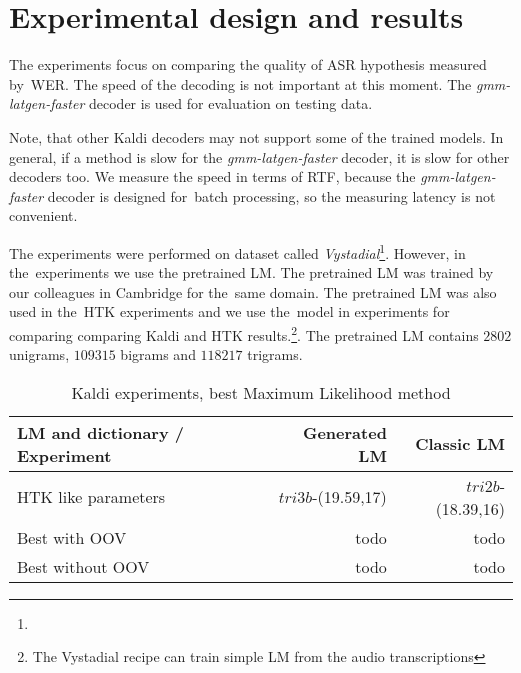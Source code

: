 {\section{Experimental design and results} 
\label{sec:exps}
The experiments focus on comparing the quality of ASR hypothesis measured by~\ac{WER}.
The speed of the decoding is not important at this moment.  The {\it gmm-latgen-faster}\/ decoder is used for evaluation on testing data. 

Note, that other Kaldi decoders may not support some of the trained models.
In general, if a method is slow for the {\it gmm-latgen-faster}\/ decoder, it is slow for other decoders too.
We measure the speed in terms of \ac{RTF}, because the {\it gmm-latgen-faster}\/ decoder is designed for~batch 
processing, so the measuring latency is not convenient.


The experiments were performed on dataset called {\it Vystadial}\footnote{}.
However, in the~experiments we use the pretrained \ac{LM}.
The pretrained \acl{LM} was trained by our colleagues in Cambridge for the~same domain.
The pretrained \ac{LM} was also used in the~\ac{HTK} experiments and we use the~model in experiments 
for comparing comparing Kaldi and \ac{HTK} results.\footnote{The Vystadial recipe can train simple \ac{LM} from the audio transcriptions}.
The pretrained \ac{LM} contains $2802$ unigrams, $109315$ bigrams and
$118217$ trigrams. 


\begin{table}[!htp]\label{tab:exp_best}
\begin{tabular}{lrr}
\hline
\parbox[t]{6.0cm}{\ac{LM} and dictionary / Experiment} & Generated \acs{LM}  & Classic \ac{LM} \\
\hline
\ac{HTK} like parameters    &  $tri3b$-(19.59,17) & $tri2b$-(18.39,16) \\
Best with OOV               & todo & todo \\
Best without OOV            & todo & todo \\
\hline
\end{tabular}
\caption{Kaldi experiments, best Maximum Likelihood method}
\end{table}

}
